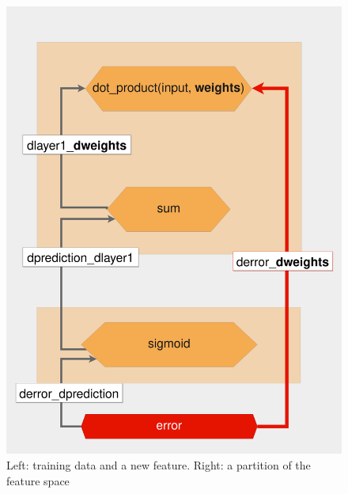 \documentclass{beamer}
\begin{document}
\begin{frame}
    \begin{figure}
        \includegraphics[width=0.9\linewidth]{WeightGradient}
        \caption{Left: training data and a new feature. Right: a partition of the feature space\cite{kroese2020}}
        \label{Fig:WeightGradient}
    \end{figure}
\end{frame}
\end{document}
